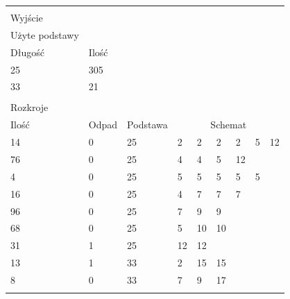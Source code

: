 \begin{longtable}{lllllllll}
                         &              &           &                  &    &    &    &   &    \\
Wyjście                   &              &           &                  &    &    &    &   &    \\
Użyte podstawy         &              &           &                  &    &    &    &   &    \\
Długość                   & Ilość     &           &                  &    &    &    &   &    \\
25                       & 305          &           &                  &    &    &    &   &    \\
33                       & 21           &           &                  &    &    &    &   &    \\
                         &              &           &                  &    &    &    &   &    \\
Rozkroje             &              &           &                  &    &    &    &   &    \\
Ilość                 & Odpad        & Podstawa & \multicolumn{6}{c}{Schemat}    \\
14                       & 0            & 25        & 2                & 2  & 2  & 2  & 5 & 12 \\
76                       & 0            & 25        & 4                & 4  & 5  & 12 &   &    \\
4                        & 0            & 25        & 5                & 5  & 5  & 5  & 5 &    \\
16                       & 0            & 25        & 4                & 7  & 7  & 7  &   &    \\
96                       & 0            & 25        & 7                & 9  & 9  &    &   &    \\
68                       & 0            & 25        & 5                & 10 & 10 &    &   &    \\
31                       & 1            & 25        & 12               & 12 &    &    &   &    \\
13                       & 1            & 33        & 2                & 15 & 15 &    &   &    \\
8                        & 0            & 33        & 7                & 9  & 17 &    &   &    \\
                         &              &           &                  &    &    &    &   &    \\

\end{longtable}

